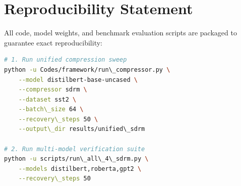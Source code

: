 \section{Reproducibility Statement}
All code, model weights, and benchmark evaluation scripts are packaged to guarantee exact reproducibility:
\begin{lstlisting}[language=bash]
# 1. Run unified compression sweep
python -u Codes/framework/run\_compressor.py \
    --model distilbert-base-uncased \
    --compressor sdrm \
    --dataset sst2 \
    --batch\_size 64 \
    --recovery\_steps 50 \
    --output\_dir results/unified\_sdrm

# 2. Run multi-model verification suite
python -u scripts/run\_all\_4\_sdrm.py \
    --models distilbert,roberta,gpt2 \
    --recovery\_steps 50
\end{lstlisting}
